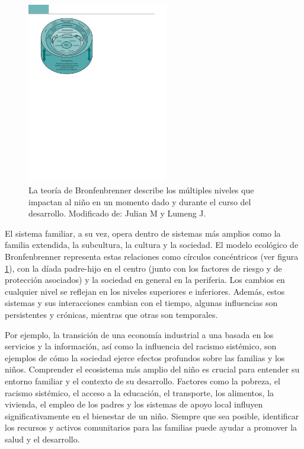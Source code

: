 \documentclass[11pt,letterpaper]{report}
\begin{document}
\begin{figure} %
    \centering
    \includegraphics[width=0.55\textwidth]{sistemasbronfenbrenner}
	\caption{La teoría de Bronfenbrenner describe los múltiples niveles que
	impactan al niño en un momento dado y durante el curso del desarrollo.
	Modificado de: Julian M y Lumeng J. \cite{Feldman3}}
	\label{fig:sistemasbronfenbrenner}
\end{figure}

El sistema familiar, a su vez, opera dentro de sistemas más amplios como la 
familia extendida, la subcultura, la cultura y la sociedad. El modelo ecológico 
de Bronfenbrenner representa estas relaciones como círculos concéntricos (ver
figura \ref{fig:sistemasbronfenbrenner}), con la díada padre-hijo en el centro
(junto con los factores de riesgo y de protección asociados) y la sociedad en
general en la periferia. Los cambios en  cualquier nivel se reflejan en los
niveles superiores e inferiores. Además, estos sistemas y sus interacciones
cambian con el tiempo, algunas influencias  son persistentes y crónicas,
mientras que otras son temporales. \cite{Nelson19}

Por ejemplo, la transición de una economía industrial a una basada en los 
servicios y la información, así como la influencia del racismo sistémico, son 
ejemplos de cómo la sociedad ejerce efectos profundos sobre las familias y los 
niños. Comprender el ecosistema más amplio del niño es crucial para entender su 
entorno familiar y el contexto de su desarrollo. Factores como la pobreza, el 
racismo sistémico, el acceso a la educación, el transporte, los alimentos, la 
vivienda, el empleo de los padres y los sistemas de apoyo local influyen 
significativamente en el bienestar de un niño. Siempre que sea posible, 
identificar los recursos y activos comunitarios para las familias puede ayudar 
a promover la salud y el desarrollo. \cite{Nelson19}
\end{document}

